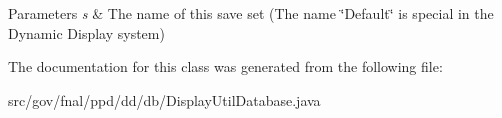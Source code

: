 \begin{DoxyParams}{Parameters}
{\em s} & The name of this save set (The name \char`\"{}\-Default\char`\"{} is special in the Dynamic Display system) \\
\hline
\end{DoxyParams}


The documentation for this class was generated from the following file\-:\begin{DoxyCompactItemize}
\item 
src/gov/fnal/ppd/dd/db/Display\-Util\-Database.\-java\end{DoxyCompactItemize}
